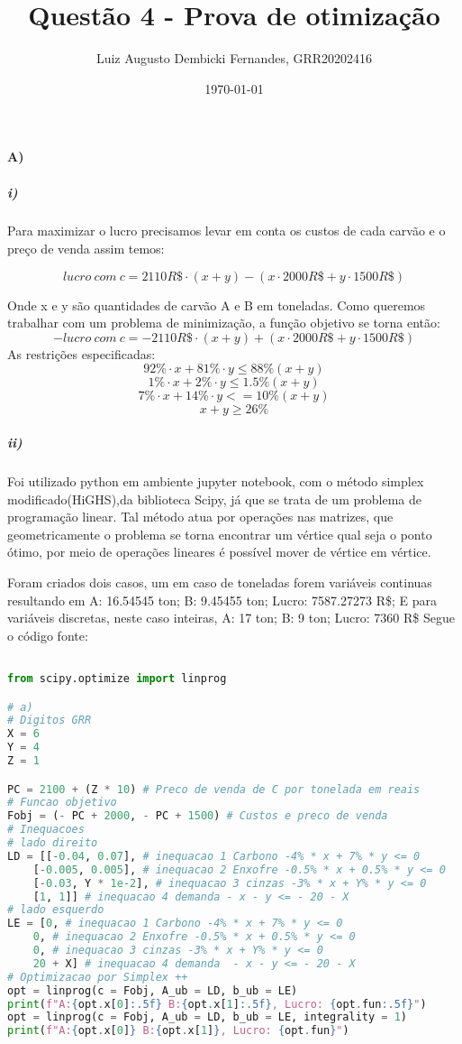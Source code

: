 \documentclass[]{article} %
\begin{document}
\title{Questão 4 - Prova de otimização}
\author{Luiz Augusto Dembicki Fernandes, GRR20202416}
\date{\today}
\maketitle

\paragraph{A)}

\subparagraph{i)}
Para maximizar o lucro precisamos levar em conta os custos de cada carvão e o preço de venda assim temos:

\[ lucro \ com \ c = 2110  R\$ \cdot (x + y)  - (x \cdot 2000  R\$ + y \cdot 1500 R\$ ) \]

Onde x e y são quantidades de carvão A e B em toneladas.
Como queremos trabalhar com um problema de minimização, a função objetivo se torna então:
\[  - lucro \ com \ c = - 2110  R\$ \cdot (x + y)  + (x \cdot 2000  R\$ + y \cdot 1500 R\$ )  \]
As restrições especificadas:
\[ 92 \% \cdot x + 81 \% \cdot y \leqslant  88 \% (x + y) \]
\[ 1 \% \cdot x + 2 \% \cdot y \leqslant 1.5 \% (x + y) \]
\[ 7 \% \cdot x +  14 \% \cdot y <=  10 \% (x + y) \]
\[ x + y \geqslant 26 \%  \]

\subparagraph{ii)}

Foi utilizado python em ambiente jupyter notebook, com o método simplex modificado(HiGHS),da biblioteca Scipy, já que se trata de um problema de programação linear.
Tal método atua por operações nas matrizes, que geometricamente o problema se torna encontrar um vértice qual seja o ponto ótimo, por meio de operações
lineares é possível mover de vértice em vértice.

Foram criados dois casos, um em caso de toneladas forem variáveis continuas resultando em A: 16.54545 ton; B: 9.45455 ton; Lucro: 7587.27273 R\$;
E para variáveis discretas, neste caso inteiras, A: 17 ton; B: 9 ton; Lucro: 7360 R\$
Segue o código fonte:
\begin{lstlisting}[language=Python]

from scipy.optimize import linprog

# a) 
# Digitos GRR
X = 6
Y = 4
Z = 1

PC = 2100 + (Z * 10) # Preco de venda de C por tonelada em reais
# Funcao objetivo
Fobj = (- PC + 2000, - PC + 1500) # Custos e preco de venda
# Inequacoes
# lado direito
LD = [[-0.04, 0.07], # inequacao 1 Carbono -4% * x + 7% * y <= 0 
    [-0.005, 0.005], # inequacao 2 Enxofre -0.5% * x + 0.5% * y <= 0
    [-0.03, Y * 1e-2], # inequacao 3 cinzas -3% * x + Y% * y <= 0
    [1, 1]] # inequacao 4 demanda - x - y <= - 20 - X  
# lado esquerdo
LE = [0, # inequacao 1 Carbono -4% * x + 7% * y <= 0 
    0, # inequacao 2 Enxofre -0.5% * x + 0.5% * y <= 0 
    0, # inequacao 3 cinzas -3% * x + Y% * y <= 0
    20 + X] # inequacao 4 demanda  - x - y <= - 20 - X
# Optimizacao por Simplex ++ 
opt = linprog(c = Fobj, A_ub = LD, b_ub = LE)
print(f"A:{opt.x[0]:.5f} B:{opt.x[1]:.5f}, Lucro: {opt.fun:.5f}")
opt = linprog(c = Fobj, A_ub = LD, b_ub = LE, integrality = 1)
print(f"A:{opt.x[0]} B:{opt.x[1]}, Lucro: {opt.fun}")
\end{lstlisting}
\end{document}

